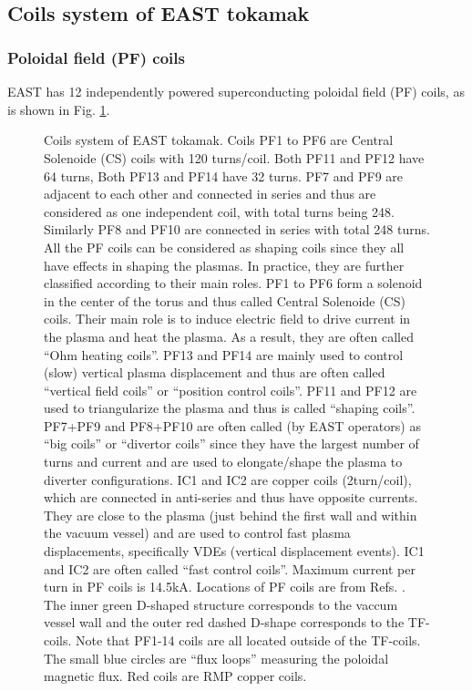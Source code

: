 \documentclass{llncs}
\begin{document}
\

\

\subsection{Coils system of EAST tokamak}

\subsubsection{Poloidal field (PF) coils}

EAST has 12 independently powered superconducting poloidal field (PF) coils,
as is shown in Fig. \ref{19-5-4-p1}.

\begin{figure}[h]
  \caption{\label{19-5-4-p1}Coils system of EAST tokamak. Coils PF1 to PF6 are
  Central Solenoide (CS) coils with 120 turns/coil. Both PF11 and PF12 have 64
  turns, Both PF13 and PF14 have 32 turns. PF7 and PF9 are adjacent to each
  other and connected in series and thus are considered as one independent
  coil, with total turns being 248. Similarly PF8 and PF10 are connected in
  series with total 248 turns. All the PF coils can be considered as shaping
  coils since they all have effects in shaping the plasmas. In practice, they
  are further classified according to their main roles. PF1 to PF6 form a
  solenoid in the center of the torus and thus called Central Solenoide (CS)
  coils. Their main role is to induce electric field to drive current in the
  plasma and heat the plasma. As a result, they are often called ``Ohm heating
  coils''. PF13 and PF14 are mainly used to control (slow) vertical plasma
  displacement and thus are often called ``vertical field coils'' or
  ``position control coils''. PF11 and PF12 are used to triangularize the
  plasma and thus is called ``shaping coils''. PF7+PF9 and PF8+PF10 are often
  called (by EAST operators) as ``big coils'' or ``divertor coils'' since they
  have the largest number of turns and current and are used to elongate/shape
  the plasma to diverter configurations. IC1 and IC2 are copper coils
  (2turn/coil), which are connected in anti-series and thus have opposite
  currents. They are close to the plasma (just behind the first wall and
  within the vacuum vessel) and are used to control fast plasma displacements,
  specifically VDEs (vertical displacement events). IC1 and IC2 are often
  called ``fast control coils''. Maximum current per turn in PF coils is
  14.5kA. Locations of PF coils are from Refs.
  {\cite{ysun2012}}{\cite{yychen2019}}. The inner green D-shaped structure
  corresponds to the vaccum vessel wall and the outer red dashed D-shape
  corresponds to the TF-coils. Note that PF1-14 coils are all located outside
  of the TF-coils. The small blue circles are ``flux loops'' measuring the
  poloidal magnetic flux. Red coils are RMP copper coils.}
\end{figure}
\end{document}
